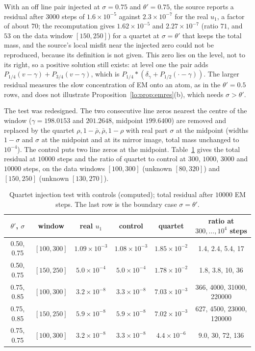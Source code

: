 With an off line pair injected at $\sigma=0.75$ and $\theta'=0.75$, the source reports a residual after $3000$ steps of $1.6\times10^{-5}$ against $2.3\times10^{-7}$ for the real $u_1$, a factor of about $70$; the recomputation gives $1.62\times10^{-5}$ and $2.27\times10^{-7}$ (ratio $71$, and $53$ on the data window $[150,250]$) for a quartet at $\sigma=\theta'$ that keeps the total mass, and the source's local misfit near the injected zero could not be reproduced, because its definition is not given. This zero lies on the level, not to its right, so a positive solution still exists: at level one the pair adds $P_{1/4}(v-\gamma)+P_{3/4}(v-\gamma)$, which is $P_{1/4}*(\delta_\gamma+P_{1/2}(\cdot-\gamma))$. The larger residual measures the slow concentration of EM onto an atom, as in the $\theta'=0.5$ rows, and does not illustrate Proposition~\ref{lo:prop:emres}(b), which needs $\sigma>\theta'$.

The test was redesigned. The two consecutive line zeros nearest the centre of the window ($\gamma=198.0153$ and $201.2648$, midpoint $199.6400$) are removed and replaced by the quartet $\rho,1-\bar\rho,\bar\rho,1-\rho$ with real part $\sigma$ at the midpoint (widths $1-\sigma$ and $\sigma$ at the midpoint and at its mirror image, total mass unchanged to $10^{-4}$). The control puts two line zeros at the midpoint. Table~\ref{lo:tab:inject} gives the total residual at $10000$ steps and the ratio of quartet to control at $300$, $1000$, $3000$ and $10000$ steps, on the data windows $[100,300]$ (unknown $[80,320]$) and $[150,250]$ (unknown $[130,270]$).

\begin{table}[ht]
\centering
\footnotesize
\setlength{\tabcolsep}{3pt}
\begin{tabular}{cccccc}
\toprule
$\theta'$, $\sigma$ & window & real $u_1$ & control & quartet & ratio at $300,\dots,10^4$ steps\\
\midrule
0.50, 0.75 & $[100,300]$ & $1.09\times10^{-3}$ & $1.08\times10^{-3}$ & $1.85\times10^{-2}$ & 1.4, 2.4, 5.4, 17\\
0.50, 0.75 & $[150,250]$ & $5.0\times10^{-4}$ & $5.0\times10^{-4}$ & $1.78\times10^{-2}$ & 1.8, 3.8, 10, 36\\
0.75, 0.85 & $[100,300]$ & $3.2\times10^{-8}$ & $3.3\times10^{-8}$ & $7.03\times10^{-3}$ & 366, 4000, 31000, 220000\\
0.75, 0.85 & $[150,250]$ & $5.9\times10^{-8}$ & $5.9\times10^{-8}$ & $7.02\times10^{-3}$ & 627, 4500, 23000, 120000\\
0.75, 0.75 & $[100,300]$ & $3.2\times10^{-8}$ & $3.3\times10^{-8}$ & $4.4\times10^{-6}$ & 9.0, 30, 72, 136\\
\bottomrule
\end{tabular}
\caption{Quartet injection test with controls (computed); total residual after $10000$ EM steps. The last row is the boundary case $\sigma=\theta'$.}\label{lo:tab:inject}
\end{table}

